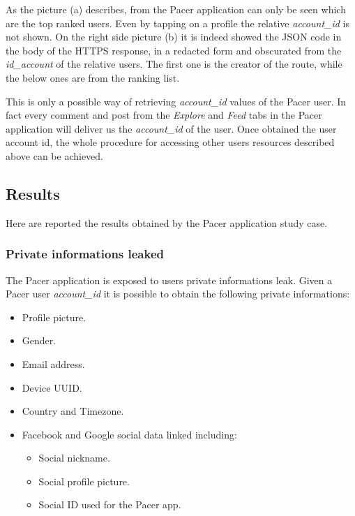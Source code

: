 				\par As the picture (a) describes, from the Pacer application can only be seen which are the top ranked users. Even by tapping on a profile the relative \textit{account\_id} is not shown. On the right side picture (b) it is indeed showed the JSON code in the body of the HTTPS response, in a redacted form and obscurated from the \textit{id\_account} of the relative users. The first one is the creator of the route, while the below ones are from the ranking list. \newline
				\par This is only a possible way of retrieving \textit{account\_id} values of the Pacer user. In fact every comment and post from the \textit{Explore} and \textit{Feed} tabs in the Pacer application will deliver us the \textit{account\_id} of the user. Once obtained the user account id, the whole procedure for accessing other users resources described above can be achieved.
				
	\subsection{Results}
		\par Here are reported the results obtained by the Pacer application study case.
		
		\subsubsection{Private informations leaked}
		\par The Pacer application is exposed to users private informations leak. Given a Pacer user \textit{account\_id} it is possible to obtain the following private informations:
		\begin{itemize}
			\item Profile picture.
			\item Gender.
			\item Email address.
			\item Device UUID.
			\item Country and Timezone.
			\item Facebook and Google social data linked including:
			\begin{itemize}
				\item Social nickname.
				\item Social profile picture.
				\item Social ID used for the Pacer app.
			\end{itemize}
		\end{itemize}

